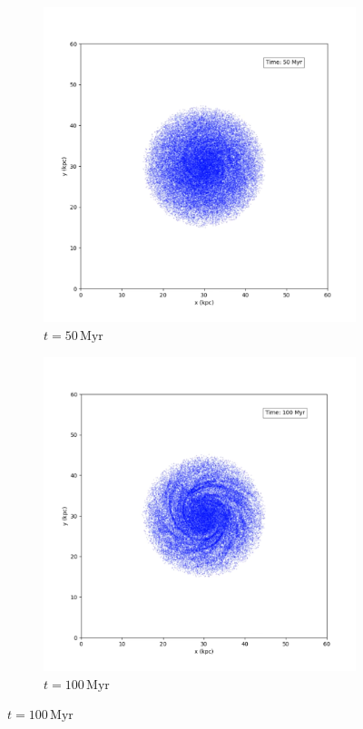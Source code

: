 \begin{figure}[htp]
    \centering
    \begin{subfigure}[b]{0.45\textwidth}
        \centering
        \includegraphics[width=\textwidth]{img/pm/50myr.png}
        \caption{$t=50\,\text{Myr}$}
        \label{fig:spiral-galaxy-evolution-pm-sub1}
    \end{subfigure}
    \hfill
    \begin{subfigure}[b]{0.45\textwidth}
        \centering
        \includegraphics[width=\textwidth]{img/pm/100myr.png}
        \caption{$t=100\,\text{Myr}$}
        \label{fig:spiral-galaxy-evolution-pm-sub2}
    \end{subfigure}


\end{figure}
